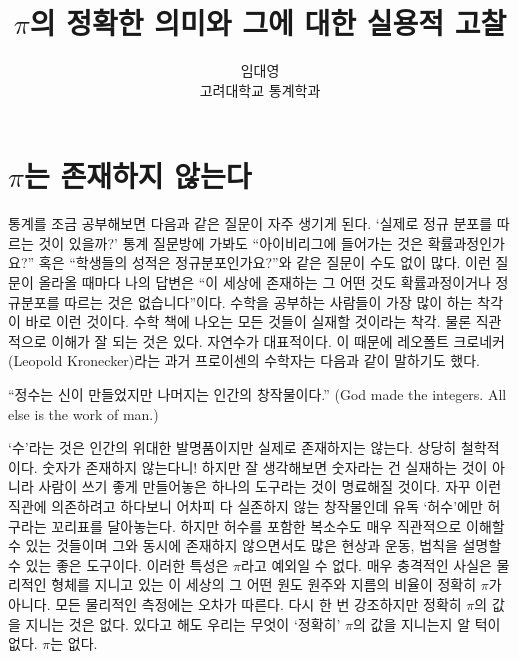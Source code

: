 \documentclass[10pt]{article}
\begin{document}
\nocite{*}

\title{$\pi$의 정확한 의미와 그에 대한 실용적 고찰}
\author{임대영 \\ 고려대학교 통계학과}
\maketitle
\pagebreak
\tableofcontents
\pagebreak
\section{$\pi$는 존재하지 않는다}
통계를 조금 공부해보면 다음과 같은 질문이 자주 생기게 된다. `실제로 정규 분포를 따르는 것이 있을까?' 통계 질문방에 가봐도 ``아이비리그에 들어가는 것은 확률과정인가요?'' 혹은 ``학생들의 성적은 정규분포인가요?''와 같은 질문이 수도 없이 많다. 이런 질문이 올라올 때마다 나의 답변은 ``이 세상에 존재하는 그 어떤 것도 확률과정이거나 정규분포를 따르는 것은 없습니다''이다. 수학을 공부하는 사람들이 가장 많이 하는 착각이 바로 이런 것이다. 수학 책에 나오는 모든 것들이 실재할 것이라는 착각. 물론 직관적으로 이해가 잘 되는 것은 있다. 자연수가 대표적이다. 이 때문에 레오폴트 크로네커(Leopold Kronecker)라는 과거 프로이센의 수학자는 다음과 같이 말하기도 했다.
\begin{center}
  ``정수는 신이 만들었지만 나머지는 인간의 창작물이다.'' (God made the integers. All else is the work of man.)
\end{center}
 `수'라는 것은 인간의 위대한 발명품이지만 실제로 존재하지는 않는다. 상당히 철학적이다. 숫자가 존재하지 않는다니! 하지만 잘 생각해보면 숫자라는 건 실재하는 것이 아니라 사람이 쓰기 좋게 만들어놓은 하나의 도구라는 것이 명료해질 것이다. 자꾸 이런 직관에 의존하려고 하다보니 어차피 다 실존하지 않는 창작물인데 유독 `허수'에만 허구라는 꼬리표를 달아놓는다. 하지만 허수를 포함한 복소수도 매우 직관적으로 이해할 수 있는 것들이며 그와 동시에 존재하지 않으면서도 많은 현상과 운동, 법칙을 설명할 수 있는 좋은 도구이다. 이러한 특성은 $\pi$라고 예외일 수 없다. 매우 충격적인 사실은 물리적인 형체를 지니고 있는 이 세상의 그 어떤 원도 원주와 지름의 비율이 정확히 $\pi$가 아니다. 모든 물리적인 측정에는 오차가 따른다. 다시 한 번 강조하지만 정확히 $\pi$의 값을 지니는 것은 없다. 있다고 해도 우리는 무엇이 `정확히' $\pi$의 값을 지니는지 알 턱이 없다. $\pi$는 없다.
\end{document}
